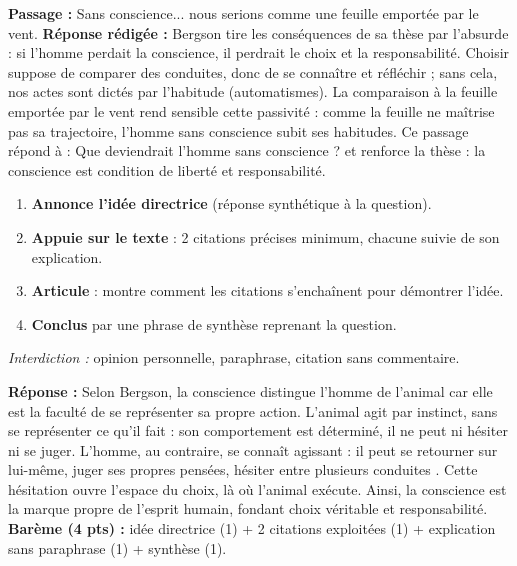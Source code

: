 \documentclass[11pt]{article}
\begin{document}
\begin{exoresolu}
\textbf{Passage :} \og Sans conscience... nous serions comme une feuille emportée par le vent. \fg
\tcblower
\textbf{Réponse rédigée :} Bergson tire les conséquences de sa thèse par l'absurde : si l'homme perdait la conscience, il perdrait le choix et la responsabilité. Choisir suppose de comparer des conduites, donc de se connaître et réfléchir ; sans cela, nos actes sont dictés par l'habitude (automatismes). La comparaison à la \og feuille emportée par le vent \fg rend sensible cette passivité : comme la feuille ne maîtrise pas sa trajectoire, l'homme sans conscience subit ses habitudes. Ce passage répond à : \og Que deviendrait l'homme sans conscience ? \fg et renforce la thèse : la conscience est condition de liberté et responsabilité.
\end{exoresolu}

\begin{methode}
\begin{enumerate}
\item \textbf{Annonce l'idée directrice} (réponse synthétique à la question).
\item \textbf{Appuie sur le texte} : 2 citations précises minimum, chacune suivie de son explication.
\item \textbf{Articule} : montre comment les citations s'enchaînent pour démontrer l'idée.
\item \textbf{Conclus} par une phrase de synthèse reprenant la question.
\end{enumerate}
\emph{Interdiction :} opinion personnelle, paraphrase, citation sans commentaire.
\end{methode}

\begin{exoresolu}
\tcblower
\textbf{Réponse :} Selon Bergson, la conscience distingue l'homme de l'animal car elle est la faculté de se représenter sa propre action. L'animal \og agit par instinct, sans se représenter ce qu'il fait \fg : son comportement est déterminé, il ne peut ni hésiter ni se juger. L'homme, au contraire, \og se connaît agissant \fg : il peut \og se retourner sur lui-même, juger ses propres pensées, hésiter entre plusieurs conduites \fg. Cette hésitation ouvre l'espace du choix, là où l'animal exécute. Ainsi, la conscience est la marque propre de l'esprit humain, fondant choix véritable et responsabilité.
\textbf{Barème (4 pts) :} idée directrice (1) + 2 citations exploitées (1) + explication sans paraphrase (1) + synthèse (1).
\end{exoresolu}
\end{document}
